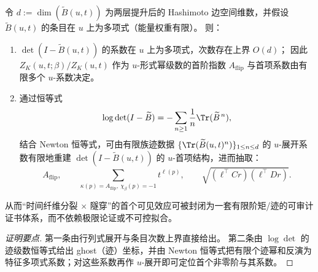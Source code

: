 \begin{conclusion}\label{con:xi-split-tunneling-finite-trace-inversion}
令 \(d:=\dim(\widetilde B(u,t))\) 为两层提升后的 Hashimoto 边空间维数，并假设 \(\widetilde B(u,t)\) 的条目在 \(u\) 上为多项式（能量权重有限）。
则：
\begin{enumerate}
  \item \(\det(I-\widetilde B(u,t))\) 的系数在 \(u\) 上为多项式，次数存在上界 \(O(d)\)；
  因此 \(Z_K(u,t;\beta)/Z_K(u,t)\) 作为 \(u\)-形式幂级数的首阶指数 \(A_{\mathrm{flip}}\) 与首项系数由有限多个 \(u\)-系数决定。
  \item 通过恒等式
  \[
  \log\det(I-\widetilde B)
  =-\sum_{n\ge 1}\frac{1}{n}\Tr(\widetilde B^{\,n}),
  \]
  结合 Newton 恒等式，可由有限族迹数据 \(\{\Tr(\widetilde B(u,t)^n)\}_{1\le n\le d}\) 的 \(u\)-展开系数有限地重建 \(\det(I-\widetilde B(u,t))\) 的 \(u\)-首项结构，进而抽取：
  \[
  A_{\mathrm{flip}},\qquad
  \sum_{\kappa(p)=A_{\mathrm{flip}},\ \chi_\beta(p)=-1}t^{\ell(p)},
  \qquad
  \sqrt{(\ell^{\!\top}Cr)(\ell^{\!\top}Dr)}.
  \]
\end{enumerate}
从而“时间纤维分裂 \(\times\) 隧穿”的首个可见效应可被封闭为一套有限阶矩/迹的可审计证书体系，而不依赖极限论证或不可控拟合。
\end{conclusion}
\begin{proof}[证明要点]
第一条由行列式展开与条目次数上界直接给出。
第二条由 \(\log\det\) 的迹级数恒等式给出 ghost（迹）坐标，并由 Newton 恒等式把有限个迹幂和反演为特征多项式系数；对这些系数再作 \(u\)-展开即可定位首个非零阶与其系数。
\end{proof}

\endinput

